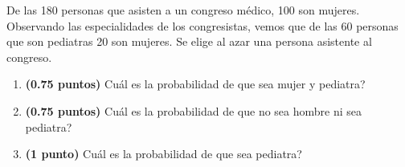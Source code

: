 
De las 180 personas que asisten a un congreso médico, 100 son mujeres. Observando las especialidades de los congresistas, vemos que de las 60 personas que son pediatras 20 son mujeres. Se elige al azar una persona asistente al congreso.
\begin{enumerate}[label=\alph*)]
\item \textbf{(0.75 puntos)} \textquestiondown{}Cuál es la probabilidad de que sea mujer y pediatra?
\item \textbf{(0.75 puntos)} \textquestiondown{}Cuál es la probabilidad de que no sea hombre ni sea pediatra?
\item \textbf{(1 punto)} \textquestiondown{}Cuál es la probabilidad de que sea pediatra?
\end{enumerate}

